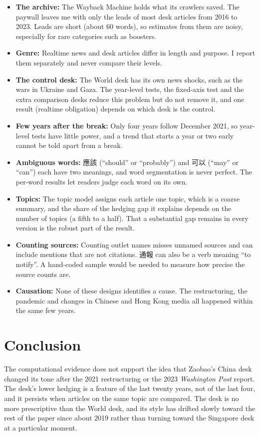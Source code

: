 \documentclass[11pt]{article}
\begin{document}
\begin{itemize}
\item \textbf{The archive:} The Wayback Machine holds what its crawlers saved. The paywall leaves me with only the leads of most desk articles from 2016 to 2023. Leads are short (about 60 words), so estimates from them are noisy, especially for rare categories such as boosters.
\item \textbf{Genre:} Realtime news and desk articles differ in length and purpose. I report them separately and never compare their levels.
\item \textbf{The control desk:} The World desk has its own news shocks, such as the wars in Ukraine and Gaza. The year-level tests, the fixed-axis test and the extra comparison desks reduce this problem but do not remove it, and one result (realtime obligation) depends on which desk is the control.
\item \textbf{Few years after the break:} Only four years follow December 2021, so year-level tests have little power, and a trend that starts a year or two early cannot be told apart from a break.
\item \textbf{Ambiguous words:} 應該 (``should'' or ``probably'') and 可以 (``may'' or ``can'') each have two meanings, and word segmentation is never perfect. The per-word results let readers judge each word on its own.
\item \textbf{Topics:} The topic model assigns each article one topic, which is a coarse summary, and the share of the hedging gap it explains depends on the number of topics (a fifth to a half). That a substantial gap remains in every version is the robust part of the result.
\item \textbf{Counting sources:} Counting outlet names misses unnamed sources and can include mentions that are not citations. 通報 can also be a verb meaning ``to notify''. A hand-coded sample would be needed to measure how precise the source counts are.
\item \textbf{Causation:} None of these designs identifies a cause. The restructuring, the pandemic and changes in Chinese and Hong Kong media all happened within the same few years.
\end{itemize}

\section{Conclusion}

The computational evidence does not support the idea that Zaobao's China desk changed its tone after the 2021 restructuring or the 2023 \textit{Washington Post} report. The desk's lower hedging is a feature of the last twenty years, not of the last four, and it persists when articles on the same topic are compared. The desk is no more prescriptive than the World desk, and its style has drifted slowly toward the rest of the paper since about 2019 rather than turning toward the Singapore desk at a particular moment.
\end{document}
